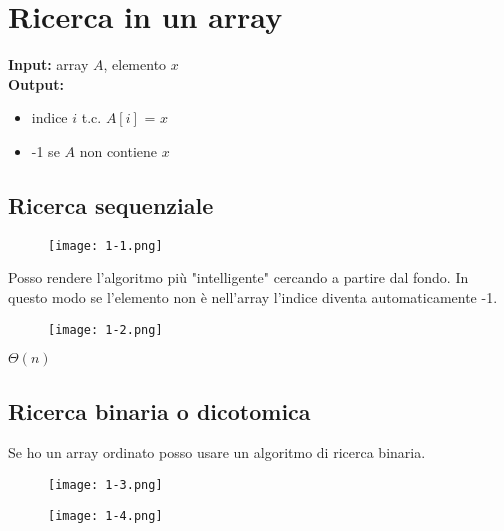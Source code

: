 \section{Ricerca in un array}

{\textbf{Input:}} array $A$, elemento $x$\\
{\textbf{Output:}} 
\begin{itemize}
    \item indice $i$ t.c. $A[i]$ = $x$
    \item -1 se $A$ non contiene $x$
\end{itemize}

\subsection{Ricerca sequenziale}
\begin{figure}[h]
    \texttt{[image: 1-1.png]}
    \centering
\end{figure}

\noindent Posso rendere l'algoritmo più "intelligente" cercando a partire dal fondo.
In questo modo se l'elemento non è nell'array l'indice diventa automaticamente -1.
\begin{figure}[h]
    \texttt{[image: 1-2.png]}
    \centering
\end{figure}

 $\Theta(n)$
\clearpage

\subsection{Ricerca binaria o dicotomica}
Se ho un array ordinato posso usare un algoritmo di ricerca binaria.

\begin{figure}[h]
    \texttt{[image: 1-3.png]}
    \centering
\end{figure}

\begin{figure}[h]
    \texttt{[image: 1-4.png]}
    \centering
\end{figure}
\clearpage


